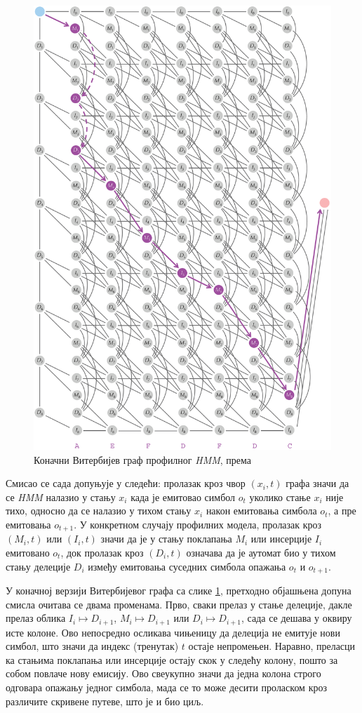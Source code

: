 \documentclass[12pt,oneside]{memoir}
\begin{document}
\begin{CJK}{UTF8}{ipxm}
\begin{figure}[H]
  \centering
  \includegraphics[width=.85\textwidth]{prof_vit2.png}
  \caption{Коначни Витербијев граф профилног \textit{HMM}, према \cite{compeau2015}}
  \label{fig:prof_vit2}
\end{figure}

Смисао се сада допуњује у следећи: пролазак кроз чвор $(x_i, t)$ графа значи да се \textit{HMM} налазио у стању $x_i$ када је емитовао симбол $o_t$ уколико стање $x_i$ није тихо, односно да се налазио у тихом стању $x_i$ након емитовања симбола $o_t$, а пре емитовања $o_{t+1}$. У конкретном случају профилних модела, пролазак кроз $(M_i, t)$ или $(I_i, t)$ значи да је у стању поклапања $M_i$ или инсерције $I_i$ емитовано $o_t$, док пролазак кроз $(D_i, t)$ означава да је аутомат био у тихом стању делеције $D_i$ између емитовања суседних симбола опажања $o_t$ и $o_{t+1}$.

У коначној верзији Витербијевог графа са слике \ref{fig:prof_vit2}, претходно објашњена допуна смисла очитава се двама променама. Прво, сваки прелаз у стање делеције, дакле прелаз облика $I_i \mapsto D_{i+1}$, $M_i \mapsto D_{i+1}$ или $D_i \mapsto D_{i+1}$, сада се дешава у оквиру исте колоне. Ово непосредно осликава чињеницу да делеција не емитује нови симбол, што значи да индекс (тренутак) $t$ остаје непромењен. Наравно, преласци ка стањима поклапања или инсерције остају скок у следећу колону, пошто за собом повлаче нову емисију. Ово свеукупно значи да једна колона строго одговара опажању једног симбола, мада се то може десити проласком кроз различите скривене путеве, што је и био циљ.


\end{CJK}
\end{document}

